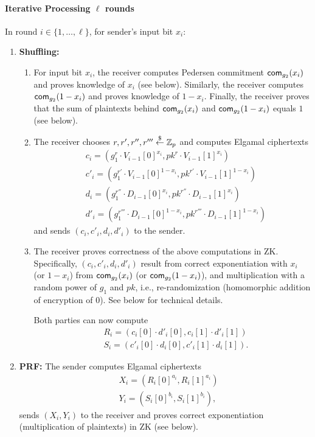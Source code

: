 \documentclass{article}
\begin{document}
\paragraph{Iterative Processing $\ell$ rounds}
In round $i\in\{1,\ldots,\ell\}$, for sender's input bit $x_i$:
\begin{enumerate}
\item {\bf Shuffling:}
\begin{enumerate}
\item   For input bit $x_i$, the receiver computes
  Pedersen commitment $\mathsf{com}_{g_2}(x_i)$ and proves knowledge of $x_i$
  (see below). Similarly, the receiver computes $\mathsf{com}_{g_2}(1-x_i)$
  and proves knowledge of $1-x_i$. Finally, the receiver proves that
  the sum of plaintexts behind $\mathsf{com}_{g_2}(x_i)$ and
  $\mathsf{com}_{g_2}(1-x_i)$ equals $1$ (see below).


\item  The receiver chooses $r,r',r'',r'''\stackrel{\$}{\leftarrow}\mathbb{Z}_p$ and computes Elgamal ciphertexts
  \begin{align*}
    &c_i=(g_1^r\cdot{}V_{i-1}[0]^{x_i},pk^{r}\cdot{}V_{i-1}[1]^{x_i})
    \\&c'_i=(g_1^{r'}\cdot{}V_{i-1}[0]^{1-x_i},pk^{r'}\cdot{}V_{i-1}[1]^{1-x_i})
    \\&d_i=(g_1^{r''}\cdot{}D_{i-1}[0]^{x_i},pk^{r''}\cdot{}D_{i-1}[1]^{x_i})
    \\&d'_i=(g_1^{r'''}\cdot{}D_{i-1}[0]^{1-x_i},pk^{r'''}\cdot{}D_{i-1}[1]^{1-x_i})%
  \end{align*}
  and sends $(c_i,c'_i,d_i,d'_i)$ to the sender.

\item The receiver proves correctness of the above computations in
  ZK. Specifically, $(c_i,c'_i,d_i,d'_i)$ result from correct
  exponentiation with $x_i$ (or $1-x_i$) from $\mathsf{com}_{g_2}(x_i)$ (or
  $\mathsf{com}_{g_2}(1-x_i)$), and multiplication with a random power of
  $g_1$ and $pk$, i.e., re-randomization (homomorphic addition of
  encryption of $0$).  See below for technical details.

   Both parties can now compute
    \begin{align*}&R_i=(c_i[0]\cdot{}d'_i[0],c_i[1]\cdot{}d'_i[1])
    \\&S_i=(c'_i[0]\cdot{}d_i[0],c'_i[1]\cdot{}d_i[1]).
    \end{align*}
   
  \end{enumerate}

\item {\bf PRF:} The sender computes Elgamal ciphertexts
  \begin{align*}
&X_i=(R_i[0]^{a_i},R_i[1]^{a_i})
\\&Y_i=(S_i[0]^{b_i},S_i[1]^{b_i}),
  \end{align*}
sends $(X_i,Y_i)$ to the receiver and proves correct exponentiation
(multiplication of plaintexts) in ZK (see below).


\end{enumerate}
\end{document}
